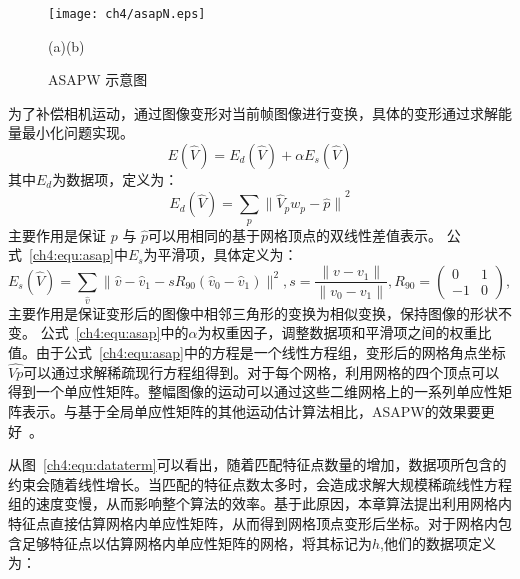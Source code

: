  \begin{figure}[!htbp]
\begin{center}
  \texttt{[image: ch4/asapN.eps]}
  \par \quad\quad\quad(a)\quad\quad\quad\quad\quad\quad\quad\quad\quad\quad\quad\quad(b)
\end{center}

\caption{ASAPW 示意图~}
\label{fig:2}       %
\end{figure}
为了补偿相机运动，通过图像变形对当前帧图像进行变换，具体的变形通过求解能量最小化问题实现。
\begin{equation}\label{ch4:equ:asap}
  E(\hat{V}) = {E}_d(\hat{V}) + \alpha{E}_{s}(\hat{V})
\end{equation}
其中$E_d$为数据项，定义为：
\begin{equation}\label{ch4:equ:dataterm}
  {E}_{d}(\hat{V}) = \sum_{p}{\parallel\hat{V}_{p}{w}_{p}- \hat{p}\parallel}^{2}
\end{equation}
主要作用是保证 \(p\) 与 $\hat{p}$可以用相同的基于网格顶点的双线性差值表示。 公式~\ref{ch4:equ:asap}中$E_s$为平滑项，具体定义为：
$${E}_{s}(\hat{V} )= \sum_{\hat{v}}\parallel\hat{v}-\hat{v}_{1} - s{R}_{90}(\hat{v}_{0} - \hat{v}_{1})\parallel^{2}, s=\frac{\parallel{v}-{v}_{1}\parallel}{\parallel{v}_{0}-{v}_{1}\parallel},{R}_{90} = \left(\begin{array}{cc}{0} &{1} \\{-1} &{0}\end{array}\right),$$
主要作用是保证变形后的图像中相邻三角形的变换为相似变换，保持图像的形状不变。
公式~\ref{ch4:equ:asap}中的$\alpha$为权重因子，调整数据项和平滑项之间的权重比值。由于公式~\ref{ch4:equ:asap}中的方程是一个线性方程组，变形后的网格角点坐标$\hat{Vp}$可以通过求解稀疏现行方程组得到。对于每个网格，利用网格的四个顶点可以得到一个单应性矩阵。整幅图像的运动可以通过这些二维网格上的一系列单应性矩阵表示。与基于全局单应性矩阵的其他运动估计算法相比，ASAPW的效果要更好~\cite{Liu_2013ASAP}。 \par
从图~\ref{ch4:equ:dataterm}可以看出，随着匹配特征点数量的增加，数据项所包含的约束会随着线性增长。当匹配的特征点数太多时，会造成求解大规模稀疏线性方程组的速度变慢，从而影响整个算法的效率。基于此原因，本章算法提出利用网格内特征点直接估算网格内单应性矩阵，从而得到网格顶点变形后坐标。对于网格内包含足够特征点以估算网格内单应性矩阵的网格，将其标记为$h$,他们的数据项定义为：
 
